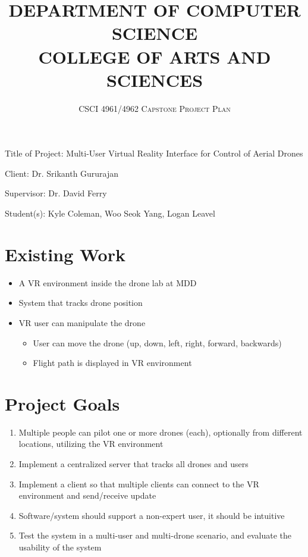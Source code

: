\documentclass[paper=a4, fontsize=10pt]{scrartcl} %
\title{
\vspace*{-50pt}
\normalfont \normalsize
\textbf{DEPARTMENT OF COMPUTER SCIENCE \\ [25pt]}
\vspace*{-20pt}
\textbf{COLLEGE OF ARTS AND SCIENCES \\ [17pt]}
}
\subtitle{
\vspace*{-20pt}
\normalfont \normalsize 
\textsc{CSCI 4961/4962 Capstone Project Plan \\ [20pt]} %
}
\author{}
\date{}
\begin{document}
\maketitle %



\vspace*{-70pt}
Title of Project: Multi-User Virtual Reality Interface for Control of Aerial Drones

Client: Dr. Srikanth Gururajan

Supervisor: Dr. David Ferry	

Student(s): Kyle Coleman, Woo Seok Yang, Logan Leavel

\section{Existing Work}
\begin{itemize}
	\setlength\itemsep{.25em}
	\item{A VR environment inside the drone lab at MDD}
	\item{System that tracks drone position}
	\item{VR user can manipulate the drone}
	\begin{itemize}
		\setlength\itemsep{.25em}
		\item{User can move the drone (up, down, left, right, forward, backwards)}
		\item{Flight path is displayed in VR environment}
	\end{itemize}
\end{itemize}


\section{Project Goals}
\begin{enumerate}
	\setlength\itemsep{.25em}
	\item{Multiple people can pilot one or more drones (each), optionally from different locations, utilizing the VR environment}
	\item{Implement a centralized server that tracks all drones and users}
	\item{Implement a client so that multiple clients can connect to the VR environment and send/receive update}
	\item{Software/system should support a non-expert user, it should be intuitive }
	\item{Test the system in a multi-user and multi-drone scenario, and evaluate the usability of the system}
\end{enumerate}
\end{document}

